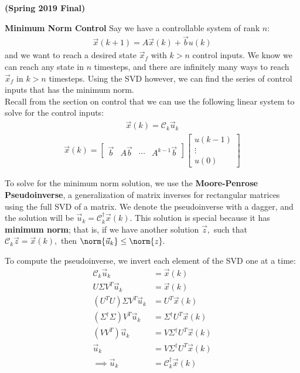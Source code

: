  {\bfseries (Spring 2019 Final)}

\textbf{Minimum Norm Control}
Say we have a controllable system of rank $n$:
\begin{align*}
    \vec{x}(k + 1) = A\vec{x}(k) + \vec{b}u(k)
\end{align*}
 and we want to reach a desired state $\vec{x}_f$ with $k > n$ control inputs. We know we can reach any state in $n$ timesteps, and there are infinitely many ways to reach $\vec{x}_f$ in $k > n$ timesteps. Using the SVD however, we can find the series of control inputs that has the minimum norm. \\
 \newline
 Recall from the section on control that we can use the following linear system to solve for the control inputs:
 \begin{align*}
    \vec{x}(k) = \mathcal{C}_k \vec{u}_k
\end{align*}
\begin{align*}
    \vec{x}(k) = \begin{bmatrix}
        \vec{b} & A\vec{b} & \cdots & A^{k - 1} \vec{b}
    \end{bmatrix} \begin{bmatrix}
        u(k - 1) \\ \vdots \\ u(0)
    \end{bmatrix}
 \end{align*}

To solve for the minimum norm solution, we use the \textbf{Moore-Penrose Pseudoinverse}, a generalization of matrix inverses for rectangular matrices using the full SVD of a matrix. We denote the pseudoinverse with a dagger, and the solution will be $\vec{u}_k = \mathcal{C}_k^{\dagger} \vec{x}(k).$ 
This solution is special because it has \textbf{minimum norm}; that is, if we have another solution $\vec{z},$ such that $\mathcal{C}_k \vec{z} = \vec{x}(k),$ then $\norm{\vec{u}_k} \leq \norm{z}.$

To compute the pseudoinverse, we invert each element of the SVD one at a time:
\begin{align*}
    \mathcal{C}_k \vec{u}_k &= \vec{x}(k) \\
    U \Sigma V^T \vec{u}_k &= \vec{x}(k)\\
    (U^T U) \Sigma V^T \vec{u}_k &= U^T \vec{x}(k) \\
    (\Sigma^{\dagger} \Sigma) V^T \vec{u}_k &= \Sigma^{\dagger} U^T \vec{x}(k) \\
    (V V^T) \vec{u}_k &= V \Sigma^{\dagger} U^T \vec{x}(k) \\
    \vec{u}_k &= V \Sigma^{\dagger} U^T \vec{x}(k) \\
    \implies \vec{u}_k &= \mathcal{C}_k^{\dagger} \vec{x}(k)
\end{align*}

